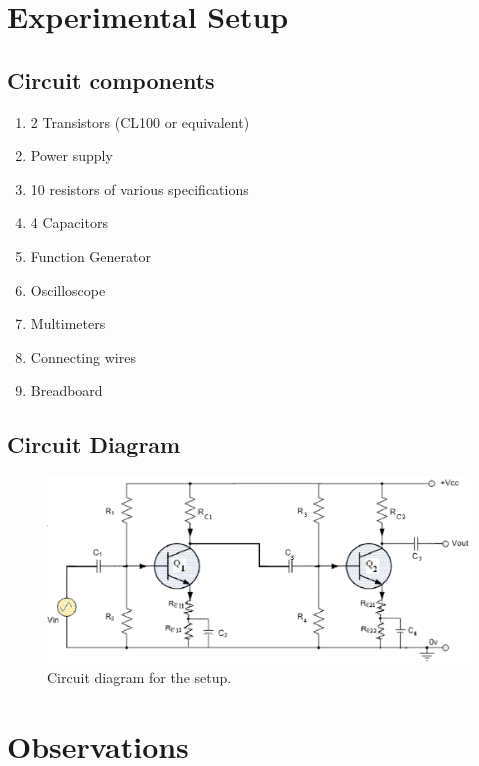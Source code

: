 \section{Experimental Setup}

    \subsection*{Circuit components}
    \begin{enumerate}
        \item 2 Transistors (CL100 or equivalent)
        \item Power supply
        \item 10 resistors of various specifications
        \item 4 Capacitors 
        \item Function Generator
        \item Oscilloscope
        \item Multimeters
        \item Connecting wires
        \item Breadboard
    \end{enumerate}

    \subsection*{Circuit Diagram}
    \begin{figure}[H]
        \centering
        \includegraphics[width=1\columnwidth]{images/f1.png}
        \caption{Circuit diagram for the setup.}
        \label{fig:1}
    \end{figure}

\section{Observations}

